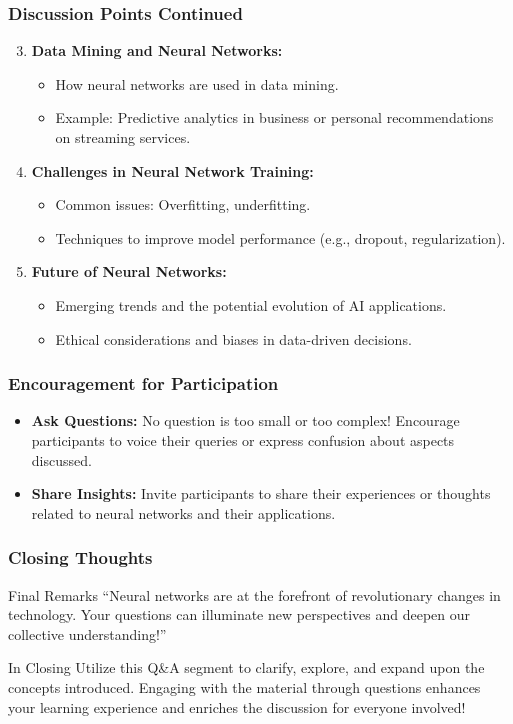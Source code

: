 \documentclass[aspectratio=169]{beamer}
\begin{document}
\begin{frame}[fragile]
    \frametitle{Discussion Points Continued}
    \begin{enumerate}
        \setcounter{enumi}{2} %
        \item \textbf{Data Mining and Neural Networks:}
        \begin{itemize}
            \item How neural networks are used in data mining.
            \item Example: Predictive analytics in business or personal recommendations on streaming services.
        \end{itemize}

        \item \textbf{Challenges in Neural Network Training:}
        \begin{itemize}
            \item Common issues: Overfitting, underfitting.
            \item Techniques to improve model performance (e.g., dropout, regularization).
        \end{itemize}

        \item \textbf{Future of Neural Networks:}
        \begin{itemize}
            \item Emerging trends and the potential evolution of AI applications.
            \item Ethical considerations and biases in data-driven decisions.
        \end{itemize}
    \end{enumerate}
\end{frame}

\begin{frame}[fragile]
    \frametitle{Encouragement for Participation}
    \begin{itemize}
        \item \textbf{Ask Questions:} No question is too small or too complex! Encourage participants to voice their queries or express confusion about aspects discussed.
        \item \textbf{Share Insights:} Invite participants to share their experiences or thoughts related to neural networks and their applications.
    \end{itemize}
\end{frame}

\begin{frame}[fragile]
    \frametitle{Closing Thoughts}
    \begin{block}{Final Remarks}
        ``Neural networks are at the forefront of revolutionary changes in technology. Your questions can illuminate new perspectives and deepen our collective understanding!''
    \end{block}
    \begin{block}{In Closing}
        Utilize this Q\&A segment to clarify, explore, and expand upon the concepts introduced. Engaging with the material through questions enhances your learning experience and enriches the discussion for everyone involved!
    \end{block}
\end{frame}
\end{document}
